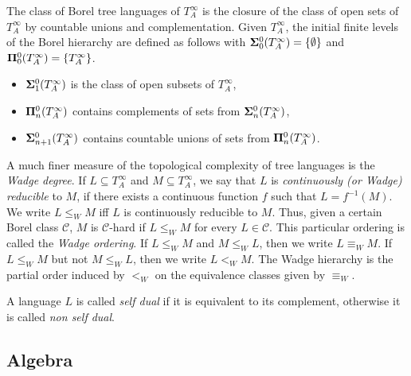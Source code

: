 The class of Borel tree languages of $T^\infty_A$ is the
closure of the class of open sets of $T^\infty_A$ by countable unions and
complementation. Given $T^\infty_A$, the initial finite levels of the
Borel hierarchy are defined as follows with ${\bf\Sigma}^0_0(T^\infty_A)= \{\emptyset\}$ and
${\bf\Pi}^0_0(T^\infty_A)=\{T^\infty_A \}$.
\begin{itemize}
\item ${\bf\Sigma}^0_1(T^\infty_A)$ is the class of open subsets of $T^\infty_A$, 
\item ${\bf\Pi}^0_n(T^\infty_A)$ contains complements of sets from ${\bf\Sigma}^0_n(T^\infty_A)$, 
\item ${\bf\Sigma}^0_{n+1}(T^\infty_A)$ contains countable unions of sets from ${\bf\Pi}^0_n(T^\infty_A)$. 
\end{itemize}


A much finer measure of the topological complexity of tree languages is the \emph{Wadge degree}.
If $L \subseteq T^\infty_A$ and $M\subseteq T^\infty_A$,   we say that $L$ is \emph{continuously (or Wadge)
reducible} to $M$, if there exists a continuous function $f$ such that $L=
f^{-1}(M)$. We write $L \leq_W M$ iff $L$ is continuously reducible to $M$.
Thus, given a certain Borel class $\mathcal{C}$, $M$ is $\mathcal{C}$-hard if $L
\leq_W M$ for every $L \in \mathcal{C}$.  This particular ordering is called the
{\em Wadge ordering}. If $L \leq_W M$ and $M \leq_W L$, then we write $L
\equiv_W M$. If $L \leq_W M$ but not $M \leq_W L$, then we write $L<_W
M$. The Wadge hierarchy is the partial order induced by $<_W$ on the
equivalence classes given by $\equiv_W$.

A language  $L$ is called {\em self dual} if it is equivalent to its complement, otherwise it is called {\em non self dual}.

\subsection{Algebra}
